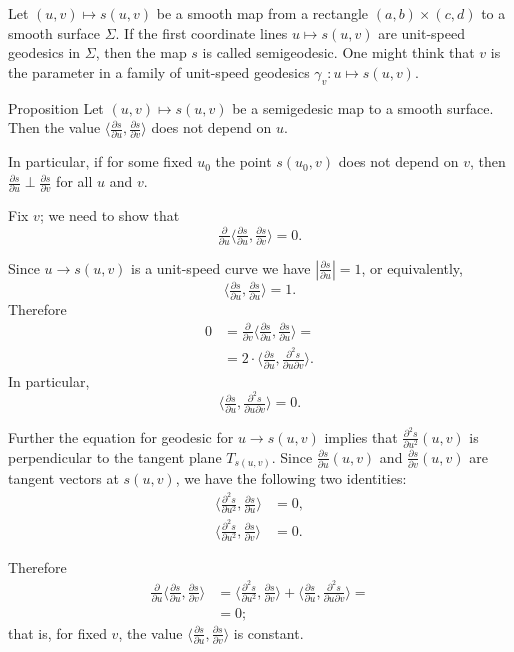 Let $(u,v)\mapsto s(u,v)$ be a smooth map from a rectangle $(a,b)\times(c,d)$ to a smooth surface $\Sigma$.
If the first coordinate lines $u\mapsto s(u,v)$ are unit-speed geodesics in $\Sigma$, then the map $s$ is called semigeodesic.
One might think that $v$ is the parameter in a family of unit-speed geodesics $\gamma_v:u\mapsto s(u,v)$.

\begin{thm}{Proposition}\label{prop:semigeodesic}
Let $(u,v)\mapsto s(u,v)$ be a semigedesic map to a smooth surface.
Then the value $\langle\tfrac{\partial s}{\partial u},\tfrac{\partial s}{\partial v}\rangle$ does not depend on $u$.

In particular,
if for some fixed $u_0$ the point $s(u_0,v)$ does not depend on $v$, 
then $\tfrac{\partial s}{\partial u}\perp \tfrac{\partial s}{\partial v}$ for all $u$ and $v$.

\end{thm}

Fix $v$; we need to show that 
\[\tfrac{\partial}{\partial u}\langle\tfrac{\partial s}{\partial u},\tfrac{\partial s}{\partial v}\rangle=0.\]

Since $u\to s(u,v)$ is a unit-speed curve we have $|\tfrac{\partial s}{\partial u}|=1$,
or equivalently,
\[\langle\tfrac{\partial s}{\partial u},\tfrac{\partial s}{\partial u}\rangle=1.\]
Therefore
\begin{align*}
0
&=\tfrac{\partial}{\partial v}\langle\tfrac{\partial s}{\partial u},\tfrac{\partial s}{\partial u}\rangle=
\\
&=2\cdot\langle\tfrac{\partial s}{\partial u},\tfrac{\partial^2 s}{\partial u\partial v}\rangle.
\end{align*}
In particular,
\[\langle\tfrac{\partial s}{\partial u},\tfrac{\partial^2 s}{\partial u\partial v}\rangle=0.\]

Further the equation for geodesic for $u\to s(u,v)$ implies that $\tfrac{\partial^2 s}{\partial u^2}(u,v)$ is perpendicular to the tangent plane $T_{s(u,v)}$.
Since $\tfrac{\partial s}{\partial u}(u,v)$ and $\tfrac{\partial s}{\partial v}(u,v)$ are tangent vectors at $s(u,v)$, we have the following two identities:
\begin{align*}
\langle\tfrac{\partial^2 s}{\partial u^2},\tfrac{\partial s}{\partial u}\rangle&=0,
\\
\langle\tfrac{\partial^2 s}{\partial u^2},\tfrac{\partial s}{\partial v}\rangle&=0.
\end{align*}

Therefore
\begin{align*}
\tfrac{\partial}{\partial u}\langle\tfrac{\partial s}{\partial u},\tfrac{\partial s}{\partial v}\rangle
&=\langle\tfrac{\partial^2 s}{\partial u^2},\tfrac{\partial s}{\partial v}\rangle
+
\langle\tfrac{\partial s}{\partial u},\tfrac{\partial^2 s}{\partial u\partial v}\rangle=
\\
&=0;
\end{align*}
that is, for fixed $v$, the value $\langle\tfrac{\partial s}{\partial u},\tfrac{\partial s}{\partial v}\rangle$ is constant.

